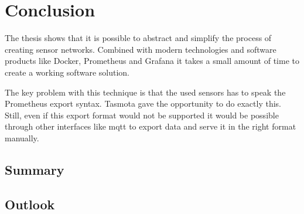 \chapter{Conclusion}
\label{chapter:fazit}
The thesis shows that it is possible to abstract and simplify the process of creating sensor networks. Combined with modern technologies and software products like Docker, Prometheus and Grafana it takes a small amount of time to create a working software solution. 

The key problem with this technique is that the used sensors has to speak the Prometheus export syntax. Tasmota gave the opportunity to do exactly this. Still, even if this export format would not be supported it would be possible through other interfaces like \gls{mqtt} to export data and serve it in the right format manually. 


\section{Summary}
\section{Outlook}
